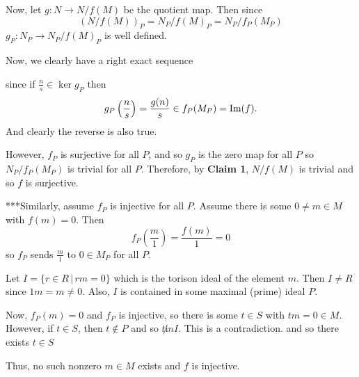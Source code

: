 \documentclass[12pt]{Qual}
\begin{document}
\begin{solution}
Now, let $g:N\to N/f(M)$ be the quotient map. Then since $$(N/f(M))_P=N_P/f(M)_P=N_P/f_P(M_P)$$ $g_P:N_P\to N_P/f(M)_P$ is well defined.

Now, we clearly have a right exact sequence
\begin{center}
\end{center}

since if $\frac{n}{s}\in\ker g_P$ then $$g_P\left(\frac{n}{s}\right)=\frac{g(n)}{s}\in f_P(M_P)=\text{Im}(f).$$ And clearly the reverse is also true.

However, $f_P$ is surjective for all $P$, and so $g_P$ is the zero map for all $P$ so $N_P/f_P(M_P)$ is trivial for all $P$. Therefore, by \textbf{Claim 1}, $N/f(M)$ is trivial and so $f$ is surjective.

\begin{mybox}
***Similarly, assume $f_P$ is injective for all $P$. Assume there is some $0\not=m\in M$ with $f(m)=0$. Then $$f_P\left(\frac{m}{1}\right)=\frac{f(m)}{1}=0$$ so $f_P$ sends $\frac{m}{1}$ to $0\in M_P$ for all $P$.

Let $I=\{r\in R\,|\,rm=0\}$ which is the torison ideal of the element $m$. Then $I\not=R$ since $1m=m\not=0$. Also, $I$ is contained in some maximal (prime) ideal $P$.

Now, $f_P(m)=0$ and $f_P$ is injective, so there is some $t\in S$ with $tm=0\in M$. However, if $t\in S$, then $t\notin P$ and so $t\not in I$. This is a contradiction. and so there exists $t\in S$

Thus, no such nonzero $m\in M$ exists and $f$ is injective.
\end{mybox}
\end{solution}
\newpage
\end{document}
